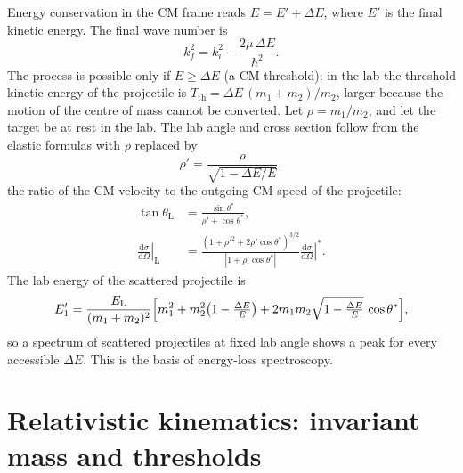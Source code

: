\documentclass[11pt,a4paper]{book}
\numberwithin{equation}{chapter}
\newcommand{\dd}{\mathrm{d}}
\newcommand{\dsdO}{\frac{\dd\sigma}{\dd\Omega}}
\begin{document}
Energy conservation in the CM frame reads $E=E'+\Delta E$, where $E'$ is the
final kinetic energy. The final wave number is
\begin{equation}\label{eq:kf}
  k_f^2=k_i^2-\frac{2\mu\,\Delta E}{\hbar^2}.
\end{equation}
The process is possible only if $E\ge\Delta E$ (a CM threshold); in the lab the
threshold kinetic energy of the projectile is
$T_{\mathrm{th}}=\Delta E\,(m_1+m_2)/m_2$, larger because the motion of the
centre of mass cannot be converted. Let $\rho=m_1/m_2$, and let the target be at
rest in the lab. The lab angle and cross section follow from the elastic
formulas with $\rho$ replaced by
\begin{equation}\label{eq:rhoprime}
  \rho'=\frac{\rho}{\sqrt{1-\Delta E/E}},
\end{equation}
the ratio of the CM velocity to the outgoing CM speed of the projectile:
\begin{align}
  \tan\theta_{\mathrm L}&=\frac{\sin\theta^*}{\rho'+\cos\theta^*},\label{eq:inel-labtan}\\
  \left.\dsdO\right|_{\mathrm L}&=
     \frac{(1+\rho'^2+2\rho'\cos\theta^*)^{3/2}}{|1+\rho'\cos\theta^*|}
     \left.\dsdO\right|^*. \label{eq:inel-labxs}
\end{align}
The lab energy of the scattered projectile is
\begin{equation}\label{eq:E1prime}
  E_1'=\frac{E_{\mathrm L}}{(m_1+m_2)^2}\Bigl[m_1^2+m_2^2\bigl(1-\tfrac{\Delta E}{E}\bigr)
    +2m_1m_2\sqrt{1-\tfrac{\Delta E}{E}}\,\cos\theta^*\Bigr],
\end{equation}
so a spectrum of scattered projectiles at fixed lab angle shows a peak for every
accessible $\Delta E$. This is the basis of energy-loss spectroscopy.

\section{Relativistic kinematics: invariant mass and thresholds}
\end{document}
